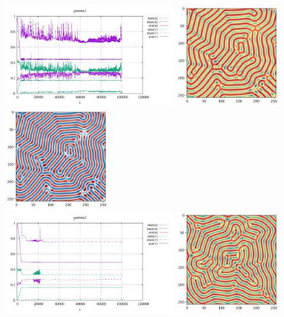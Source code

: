 \begin{center}
\includegraphics[height=4.5cm]{python_codes/fieldstone_171/results/gamma1_stats}
\includegraphics[height=4.5cm]{python_codes/fieldstone_171/results/gamma1_solution_final_u.png}
\includegraphics[height=4.5cm]{python_codes/fieldstone_171/results/gamma1_solution_final_v.png}\\
\includegraphics[height=4.5cm]{python_codes/fieldstone_171/results/gamma2_stats}
\includegraphics[height=4.5cm]{python_codes/fieldstone_171/results/gamma2_solution_final_u.png}

\end{center}
